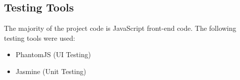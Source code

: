 \documentclass[12pt, titlepage]{article}
\begin{document}
\subsection{Testing Tools}
The majority of the project code is JavaScript front-end code. The following testing tools were used:
\begin{itemize}
	\item PhantomJS (UI Testing)
	\item Jasmine (Unit Testing) 
\end{itemize}



	
	



		
\end{document}
